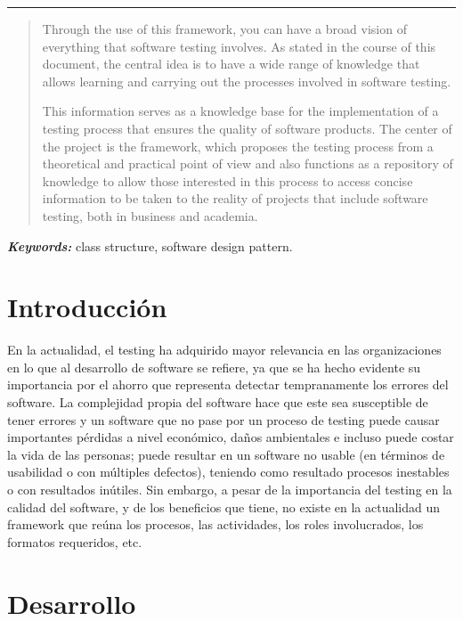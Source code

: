 \documentclass[12pt,letterpaper]{article}
\providecommand{\keywords}[1]
{
  \small	
  \textbf{\textit{Keywords: }} #1
}
\begin{document}
\begin{center}\rule{1\textwidth}{0.05mm} \end{center}

\begin{abstract}
    Through the use of this framework, you can have a broad vision of everything that software testing involves. As stated in the course of this document, the central idea is to have a wide range of knowledge that allows learning and carrying out the processes involved in software testing.

    This information serves as a knowledge base for the implementation of a testing process that ensures the quality of software products. The center of the project is the framework, which proposes the testing process from a theoretical and practical point of view and also functions as a repository of knowledge to allow those interested in this process to access concise information to be taken to the reality of projects that include software testing, both in business and academia.

\end{abstract}
\keywords{class structure, software design pattern.}



\section{Introducción}
En la actualidad, el testing ha adquirido mayor relevancia 
en las organizaciones en lo que al desarrollo de software se refiere, ya que se ha hecho evidente su importancia por el ahorro que representa detectar tempranamente los errores del software.
La complejidad propia del software hace que este sea susceptible 
de tener errores y un software que no pase por un proceso de testing
puede causar importantes pérdidas a nivel económico, daños ambientales 
e incluso puede costar la vida de las personas; puede resultar en un software
no usable (en términos de usabilidad o con múltiples defectos), teniendo como 
resultado procesos inestables o con resultados inútiles. Sin embargo, a pesar 
de la importancia del testing en la calidad del software, y de los beneficios 
que tiene, no existe en la actualidad un framework que reúna los procesos, las 
actividades, los roles involucrados, los formatos requeridos, etc.

\section{Desarrollo}
\end{document}
